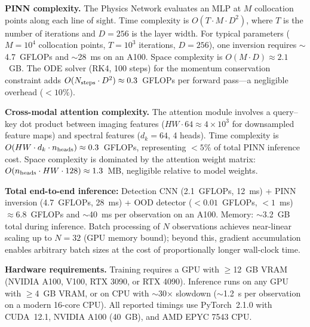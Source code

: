 \documentclass[usenatbib]{mnras}
\begin{document}
\textbf{PINN complexity.} The Physics Network evaluates an MLP at $M$ collocation points along each line of sight. Time complexity is $O(T \cdot M \cdot D^2)$, where $T$ is the number of iterations and $D=256$ is the layer width. For typical parameters ($M=10^4$ collocation points, $T=10^3$ iterations, $D=256$), one inversion requires $\sim$4.7~GFLOPs and $\sim$28~ms on an A100. Space complexity is $O(M \cdot D) \approx 2.1$~GB. The ODE solver (RK4, 100 steps) for the momentum conservation constraint adds $O(N_{\rm steps} \cdot D^2) \approx 0.3$~GFLOPs per forward pass---a negligible overhead ($<10\%$).

\textbf{Cross-modal attention complexity.} The attention module involves a query--key dot product between imaging features ($HW \cdot 64 \approx 4 \times 10^3$ for downsampled feature maps) and spectral features ($d_k=64$, 4 heads). Time complexity is $O(HW \cdot d_k \cdot n_{\rm heads}) \approx 0.3$~GFLOPs, representing $<5\%$ of total PINN inference cost. Space complexity is dominated by the attention weight matrix: $O(n_{\rm heads} \cdot HW \cdot 128) \approx 1.3$~MB, negligible relative to model weights.

\textbf{Total end-to-end inference:} Detection CNN (2.1~GFLOPs, 12~ms) + PINN inversion (4.7~GFLOPs, 28~ms) + OOD detector ($<0.01$~GFLOPs, $<1$~ms) $\approx 6.8$~GFLOPs and $\sim$40~ms per observation on an A100. Memory: $\sim$3.2~GB total during inference. Batch processing of $N$ observations achieves near-linear scaling up to $N=32$ (GPU memory bound); beyond this, gradient accumulation enables arbitrary batch sizes at the cost of proportionally longer wall-clock time.

\textbf{Hardware requirements.} Training requires a GPU with $\geq$12~GB VRAM (NVIDIA A100, V100, RTX 3090, or RTX 4090). Inference runs on any GPU with $\geq$4~GB VRAM, or on CPU with $\sim$30$\times$ slowdown ($\sim$1.2~s per observation on a modern 16-core CPU). All reported timings use PyTorch~2.1.0 with CUDA~12.1, NVIDIA A100 (40~GB), and AMD EPYC 7543 CPU.
\end{document}
